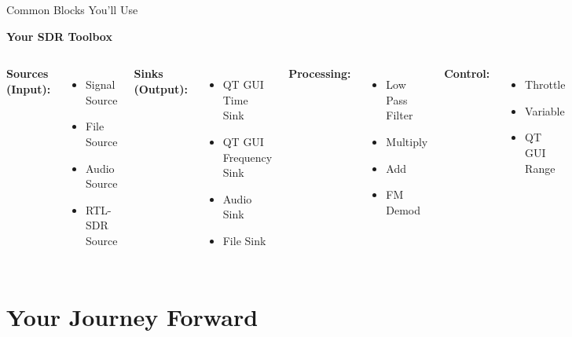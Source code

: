\documentclass[aspectratio=169,12pt]{beamer}
\begin{document}
\begin{frame}{Common Blocks You'll Use}
\begin{center}
\Large\textbf{Your SDR Toolbox}
\end{center}
\vspace{0.5em}

\begin{columns}
\textbf{Sources (Input):}
\begin{itemize}
    \item Signal Source
    \item File Source
    \item Audio Source
    \item RTL-SDR Source
\end{itemize}

\textbf{Sinks (Output):}
\begin{itemize}
    \item QT GUI Time Sink
    \item QT GUI Frequency Sink
    \item Audio Sink
    \item File Sink
\end{itemize}

\textbf{Processing:}
\begin{itemize}
    \item Low Pass Filter
    \item Multiply
    \item Add
    \item FM Demod
\end{itemize}

\textbf{Control:}
\begin{itemize}
    \item Throttle
    \item Variable
    \item QT GUI Range
\end{itemize}
\end{columns}
\end{frame}

\section{Your Journey Forward}
\end{document}
